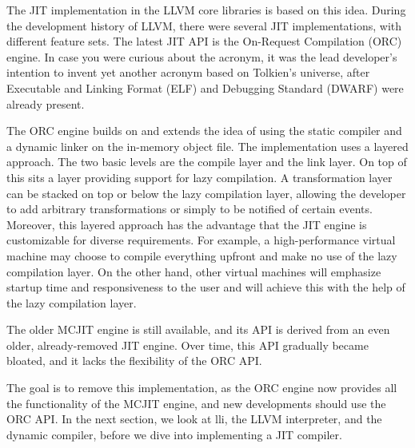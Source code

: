 The JIT implementation in the LLVM core libraries is based on this idea.
During the development history of LLVM, there were several JIT implementations, with different feature sets. The latest JIT API is the On-Request Compilation (ORC) engine. In case you were curious about the acronym, it was the lead developer’s intention to invent yet another acronym based on Tolkien’s universe, after Executable and Linking Format (ELF) and Debugging Standard (DWARF) were already present.

The ORC engine builds on and extends the idea of using the static compiler and a dynamic linker on the in-memory object file. The implementation uses a layered approach. The two basic levels are the compile layer and the link layer. On top of this sits a layer providing support for lazy compilation. A transformation layer can be stacked on top or below the lazy compilation layer, allowing the developer to add arbitrary transformations or simply to be notified of certain events. Moreover, this layered approach has the advantage that the JIT engine is customizable for diverse requirements. For example, a high-performance virtual machine may choose to compile everything upfront and make no use of the lazy compilation layer. On the other hand, other virtual machines will emphasize startup time and responsiveness to the user and will achieve this with the help of the lazy compilation layer.

The older MCJIT engine is still available, and its API is derived from an even older, already-removed JIT engine. Over time, this API gradually became bloated, and it lacks the flexibility of the ORC API.

The goal is to remove this implementation, as the ORC engine now provides all the functionality of the MCJIT engine, and new developments should use the ORC API.
In the next section, we look at lli, the LLVM interpreter, and the dynamic compiler, before we dive into implementing a JIT compiler.








































